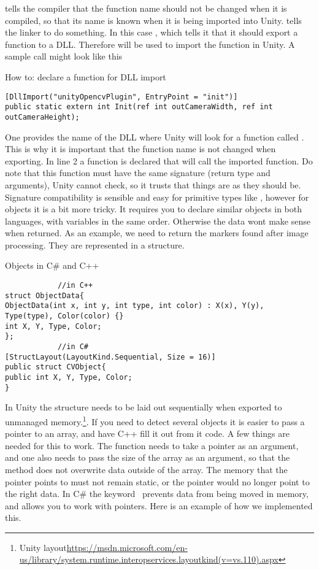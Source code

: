  tells the compiler that the function name should not be changed when it is compiled, so that its name is known when it is being imported into Unity.  tells the linker to do something. In this case , which tells it that it should export a function to a DLL. Therefore  will be used to import the function in Unity. A sample call might look like this\\
\begin{listing}[H]
	\caption{How to: declare a function for DLL import}
	\label{listing:dllImport}
	\begin{verbatim}
[DllImport("unityOpencvPlugin", EntryPoint = "init")]
public static extern int Init(ref int outCameraWidth, ref int outCameraHeight);
	\end{verbatim}
\end{listing}
One provides the name of the DLL where Unity will look for a function called . This is why it is important that the function name is not changed when exporting. In line 2 a function is declared that will call the imported function. Do note that this function must have the same signature (return type and arguments), Unity cannot check, so it trusts that things are as they should be. Signature compatibility is sensible and easy for primitive types like , however for objects it is a bit more tricky. It requires you to declare similar objects in both languages, with variables in the same order. Otherwise the data wont make sense when returned. As an example, we need to return the markers found after image processing. They are represented in a structure. 
\begin{listing}[H]
	\caption{Objects in C\# and C++}
	\label{listing:objects}
	\begin{verbatim}
			//in C++
struct ObjectData{
ObjectData(int x, int y, int type, int color) : X(x), Y(y), Type(type), Color(color) {}
int X, Y, Type, Color;
};
			//in C#	
[StructLayout(LayoutKind.Sequential, Size = 16)]
public struct CVObject{
public int X, Y, Type, Color;
}
	\end{verbatim}
\end{listing}
In Unity the structure needs to be laid out sequentially when exported to unmanaged memory.\footnote{Unity layout\url{https://msdn.microsoft.com/en-us/library/system.runtime.interopservices.layoutkind(v=vs.110).aspx}}. If you need to detect several objects it is easier to pass a pointer to an array, and have C++ fill it out from it code. A few things are needed for this to work. The function needs to take a pointer as an argument, and one also needs to pass the size of the array as an argument, so  that the method does not overwrite data outside of the array. The memory that the pointer points to must not remain static, or the pointer would no longer point to the right data. In C\# the keyword  prevents data from being moved in memory, and  allows you to work with pointers. Here is an example of how we implemented this.
